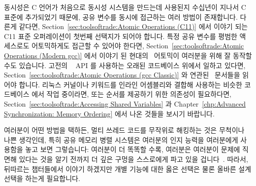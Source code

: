동시성은 C 언어가 처음으로 동시성 시스템을 만드는데 사용된지 수십년이 지나서 C
표준에 추가되었기 때문에, 공유 변수를 동시에 접근하는 여러 방법이 존재합니다.
다른게 같다면,
Section~\ref{sec:toolsoftrade:Atomic Operations (C11)}
에서 이야기 되는 C11 표준 오퍼레이션이 첫번째 선택지가 되어야 합니다.
특정 공유 변수를 평범한 액세스로도 어토믹하게도 접근할 수 있어야 한다면,
Section~\ref{sec:toolsoftrade:Atomic Operations (Modern gcc)}
에서 이야기 된 현대의 \GCC\ 어토믹이 여러분을 위해 잘 동작할 수도 있습니다.
고전의 \GCC\  API 를 사용하는 오래된 코드베이스 위에서 일하고
있다면,
Section~\ref{sec:toolsoftrade:Atomic Operations (gcc Classic)}
와 연관된 \GCC\ 문서들을 읽어야 합니다.
리눅스 커널이나 
 키워드를 인라인 어셈블리와 결합해 사용하는 비슷한 코드베이스
에서 작업 중이라면, 또는 순서를 제공하기 위한 의존성이 필요하다면,
Section~\ref{sec:toolsoftrade:Accessing Shared Variables} 과
Chapter~\ref{chp:Advanced Synchronization: Memory Ordering} 에서 나온 것들을
보시기 바랍니다.

여러분이 어떤 방법을 택하든, 멀티 쓰레드 코드를 무작위로 해킹하는 것은 무척이나
나쁜 생각인데, 특히 공유 메모리 병렬 시스템은 여러분의 인지 능력을 여러분에게
사용함을 놓고 보면 그렇습니다: 여러분이 더 똑똑할 수록, 여러분은 여러분이
문제에 직면해 있다는 것을 알기 전까지 더 깊은 구멍을 스스로에게 파고 있을
겁니다~\cite{DeadlockEmpire2016}.
따라서, 뒤따르는 챕터들에서 이야기 하겠지만 개별 기능에 대한 옳은 선택은 물론
올바른 설계 선택을 하는게 필요합니다.

